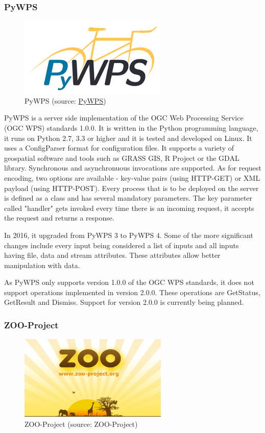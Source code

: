 \subsubsection{PyWPS}
\begin{figure}[H] \centering
      \includegraphics[width=200pt]{./pictures/pywps.png}
      \caption[PyWPS logo]{PyWPS (source:
\href{http://pywps.org/images/pywps.png}{PyWPS})}
      \label{fig:PyWPS}
  \end{figure}

PyWPS is a server side implementation of the OGC Web Processing
Service (OGC WPS) standards 1.0.0. It is written in the Python
programming language, it runs on Python 2.7, 3.3 or higher and it is
tested and developed on Linux. It uses a ConfigParser format for
configuration files. It supports a variety of geospatial software and
tools such as GRASS GIS, R Project or the GDAL library. Synchronous
and asynchronuous invocations are supported. As for request encoding,
two options are available - key-value pairs (using HTTP-GET) or XML
payload (using HTTP-POST). Every process that is to be deployed on the
server is defined as a class and has several mandatory parameters. The
key parameter called "handler" gets invoked every time there is an
incoming request, it accepts the request and returns a response.

In 2016, it upgraded from PyWPS 3 to PyWPS 4. Some of the more
significant changes include every input being considered a list of
inputs and all inputs having file, data and stream attributes. These
attributes allow better manipulation with data.
	
As PyWPS only supports version 1.0.0 of the OGC WPS standards, it does
not support operations implemented in version 2.0.0. These operations
are GetStatus, GetResult and Dismiss. Support for version 2.0.0 is
currently being planned.\cite{pywps}
 

\subsubsection{ZOO-Project}
\begin{figure}[H] \centering
      \includegraphics[width=200pt]{./pictures/zoo.png}
      \caption[ZOO-Project logo]{ZOO-Project (source: ZOO-Project)}
      \label{fig:ZOO-Project}
  \end{figure}

